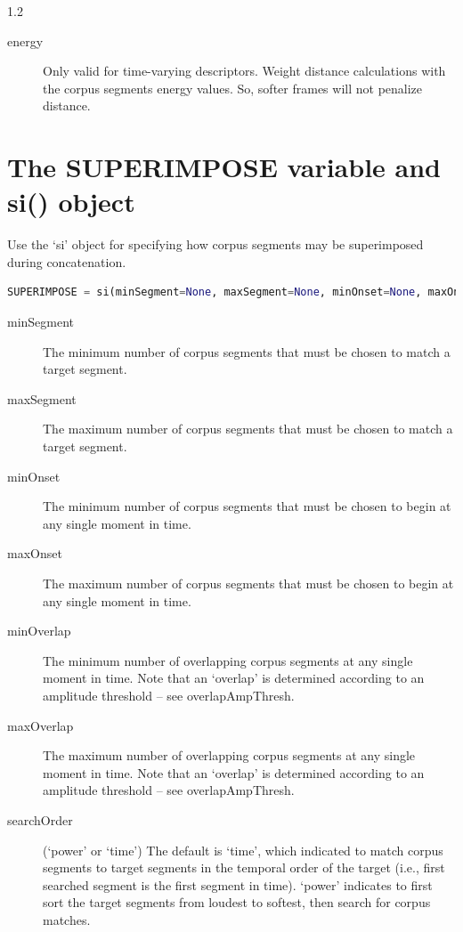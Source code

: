 \documentclass{article}
\begin{document}
\begin{spacing}{1.2}
\begin{description}
\item[energy] Only valid for time-varying descriptors.  Weight distance calculations with the corpus segments energy values.  So, softer frames will not penalize distance.
\end{description}


\section{The SUPERIMPOSE variable and si() object}
Use the `si' object for specifying how corpus segments may be superimposed during concatenation.

 \begin{lstlisting}[language=python]
SUPERIMPOSE = si(minSegment=None, maxSegment=None, minOnset=None, maxOnset=8, minOverlap=None, maxOverlap=None, searchOrder='power', calcMethod='mixture', peakAlign=False)
\end{lstlisting}
 
\begin{description}

\item[minSegment] The minimum number of corpus segments that must be chosen to match a target segment.
\item[maxSegment] The maximum number of corpus segments that must be chosen to match a target segment.
\item[minOnset] The minimum number of corpus segments that must be chosen to begin at any single moment in time.
\item[maxOnset] The maximum number of corpus segments that must be chosen to begin at any single moment in time.
\item[minOverlap] The minimum number of overlapping corpus segments at any single moment in time.  Note that an `overlap' is determined according to an amplitude threshold -- see overlapAmpThresh.
\item[maxOverlap] The maximum number of overlapping corpus segments at any single moment in time.  Note that an `overlap' is determined according to an amplitude threshold -- see overlapAmpThresh.

\item[searchOrder] (`power' or `time')  The default is `time', which indicated to match corpus segments to target segments in the temporal order of the target (i.e., first searched segment is the first segment in time).  `power' indicates to first sort the target segments from loudest to softest, then search for corpus matches.


\end{description}
\end{spacing}
\end{document}
